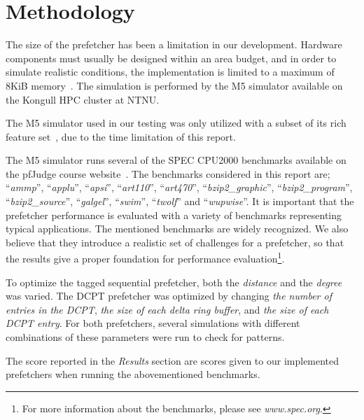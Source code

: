\section{Methodology}

The size of the prefetcher has been a limitation in our development. Hardware
components must usually be designed within an area budget, and in order to
simulate realistic conditions, the implementation is limited to a maximum of
8KiB memory~\cite{guidelines}. The simulation is performed by the M5 simulator
available on the Kongull HPC cluster at NTNU.

The M5 simulator used in our testing was only utilized with a subset of its rich
feature set~\cite{user_doc}, due to the time limitation of this report.


The M5 simulator runs several of the SPEC CPU2000 benchmarks available on the
pfJudge course website~\cite{guidelines}. The benchmarks considered in this
report are; ``\emph{ammp}'', ``\emph{applu}'', ``\emph{apsi}'',
``\emph{art110}'', ``\emph{art470}'', ``\emph{bzip2\_graphic}'',
``\emph{bzip2\_program}'', ``\emph{bzip2\_source}'', ``\emph{galgel}'',
``\emph{swim}'', ``\emph{twolf}'' and ``\emph{wupwise}''. It is important that
the prefetcher performance is evaluated with a variety of benchmarks
representing typical applications. The mentioned benchmarks are widely
recognized. We also believe that they introduce a realistic set of challenges
for a prefetcher, so that the results give a proper foundation for performance
evaluation\footnote{For more information about the benchmarks, please see
\emph{www.spec.org}.}.

To optimize the tagged sequential prefetcher, both the \emph{distance} and
the \emph{degree} was varied. The DCPT prefetcher was optimized by changing
\emph{the number of entries in the DCPT}, \emph{the size of each delta
ring buffer}, and \emph{the size of each DCPT entry}. For both prefetchers, several
simulations with different combinations of these parameters were run to check for patterns.


The score reported in the \textit{Results} section are scores given to our
implemented prefetchers when running the abovementioned benchmarks.

